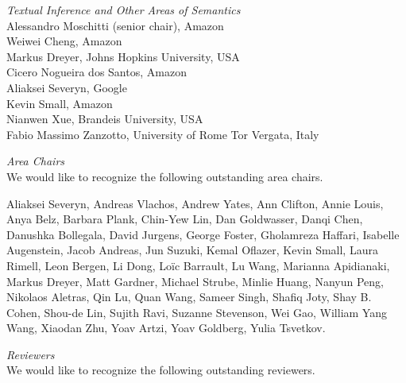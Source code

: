\emph{Textual Inference and Other Areas of Semantics} \\
\hspace*{0.2in}Alessandro Moschitti (senior chair), Amazon \\
\hspace*{0.2in}Weiwei Cheng, Amazon \\
\hspace*{0.2in}Markus Dreyer, Johns Hopkins University, USA \\
\hspace*{0.2in}Cicero Nogueira dos Santos, Amazon \\
\hspace*{0.2in}Aliaksei Severyn, Google \\
\hspace*{0.2in}Kevin Small, Amazon \\
\hspace*{0.2in}Nianwen Xue, Brandeis University, USA \\
\hspace*{0.2in}Fabio Massimo Zanzotto, University of Rome Tor Vergata, Italy

\vspace{0.3cm}
\emph{Area Chairs} \\
\hspace*{0.2in}We would like to recognize the following outstanding area chairs.\\

    
    \begin{addmargin}[0.2in]{0em}
Aliaksei Severyn, Andreas Vlachos, Andrew Yates, Ann Clifton, Annie Louis, Anya Belz, Barbara Plank, Chin-Yew Lin, Dan Goldwasser, Danqi Chen, Danushka Bollegala, David Jurgens, George Foster, Gholamreza Haffari, Isabelle Augenstein, Jacob Andreas, Jun Suzuki, Kemal Oflazer, Kevin Small, Laura Rimell, Leon Bergen, Li Dong, Loïc Barrault, Lu Wang, Marianna Apidianaki, Markus Dreyer, Matt Gardner, Michael Strube, Minlie Huang, Nanyun Peng, Nikolaos Aletras, Qin Lu, Quan Wang, Sameer Singh, Shafiq Joty, Shay B. Cohen, Shou-de Lin, Sujith Ravi, Suzanne Stevenson, Wei Gao, William Yang Wang, Xiaodan Zhu, Yoav Artzi, Yoav Goldberg, Yulia Tsvetkov.
\end{addmargin}

\vspace{0.3cm}
\emph{Reviewers} \\
\hspace*{0.2in}We would like to recognize the following outstanding reviewers.\\

